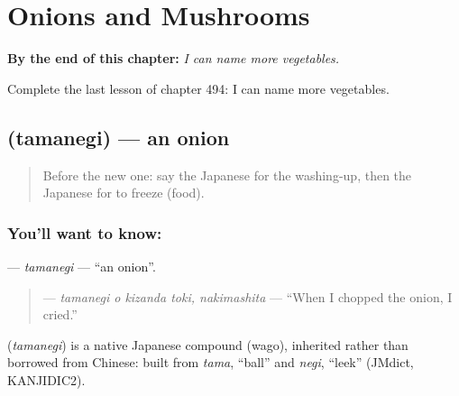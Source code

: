 
\chapter{Onions and Mushrooms}
\label{ch:ja-onions-and-mushrooms}

\begin{chapteropening}
\textbf{By the end of this chapter:} \emph{I can name more vegetables.}

Complete the last lesson of chapter 494: I can name more vegetables.
\end{chapteropening}

\section[\texorpdfstring{\ja{たまねぎ} (tamanegi)}{たまねぎ (tamanegi)}]{ (tamanegi) — an onion}

\label{lesson:JA-C494-tamanegi}



\begin{quote}
Before the new one: say the Japanese for the washing-up, then the Japanese for to freeze (food).
\end{quote}

\subsection*{You'll want to know: }
\textbf{} — \emph{tamanegi} — \textquotedblleft{}an onion\textquotedblright{}.

\begin{quote}
\textbf{  } — \emph{tamanegi o kizanda toki, nakimashita} — \textquotedblleft{}When I chopped the onion, I cried.\textquotedblright{}
\end{quote}

\begin{cousinweb}
\textbf{} (\emph{tamanegi}) is a native Japanese compound (wago), inherited rather than borrowed from Chinese: built from \emph{tama}, \textquotedblleft{}ball\textquotedblright{} and \emph{negi}, \textquotedblleft{}leek\textquotedblright{} (JMdict, KANJIDIC2).
\end{cousinweb}

